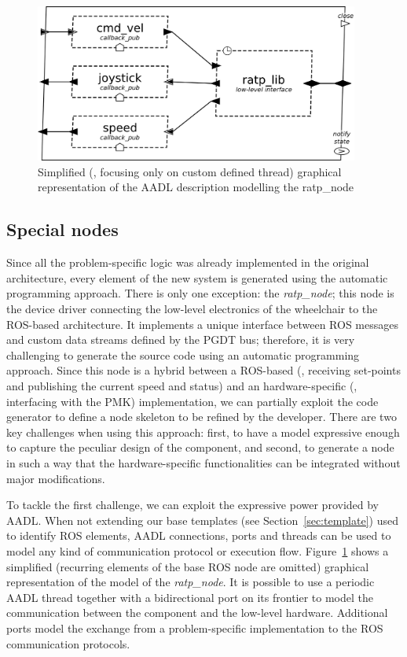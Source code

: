 \begin{figure}[t]
\centering
\includegraphics[width=0.95\textwidth]{gfx/pmk/ratp}
\caption[Simplified graphical representation of the AADL description modelling the ratp\_node]{Simplified (\ie, focusing only on custom defined thread) graphical representation of the AADL description modelling the ratp\_node}
\label{fig:pmk-ratp}
\end{figure}

\subsection{Special nodes}
\label{sec:special-node}
Since all the problem-specific logic was already implemented in the original architecture, every element of the new system is generated using the automatic programming approach. There is only one exception: the \textit{ratp\_node}; this node is the device driver connecting the low-level electronics of the wheelchair to the ROS-based architecture. It implements a unique interface between ROS messages and custom data streams defined by the PGDT bus; therefore, it is very challenging to generate the source code using an automatic programming approach. Since this node is a hybrid between a ROS-based (\ie, receiving set-points and publishing the current speed and status) and an hardware-specific (\ie, interfacing with the PMK) implementation, we can partially exploit the code generator to define a node skeleton to be refined by the developer. There are two key challenges when using this approach: first, to have a model expressive enough to capture the peculiar design of the component, and second, to generate a node in such a way that the hardware-specific functionalities can be integrated without major modifications.

To tackle the first challenge, we can exploit the expressive power provided by AADL. When not extending our base templates (see Section~\ref{sec:template}) used to identify ROS elements,  AADL connections, ports and threads can be used to model any kind of communication protocol or execution flow. Figure~\ref{fig:pmk-ratp} shows a simplified (recurring elements of the base ROS node are omitted) graphical representation of the model of the \textit{ratp\_node}. It is possible to use a periodic AADL thread together with a bidirectional port on its frontier to model the communication between the component and the low-level hardware. Additional ports model the exchange from a problem-specific implementation to the ROS communication protocols.  


